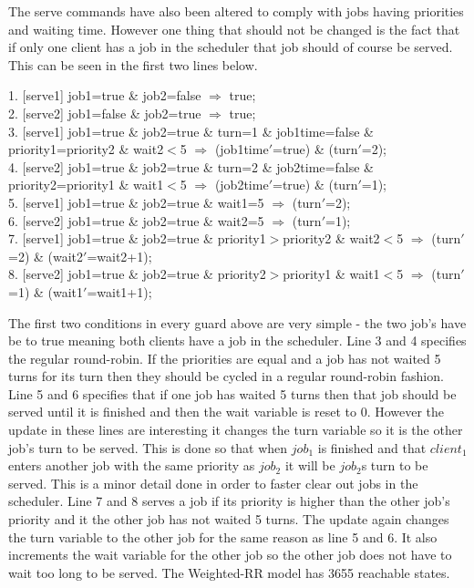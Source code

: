 \documentclass[12pt]{report}
\begin{document}
The serve commands have also been altered to comply with jobs having priorities and waiting time. However one thing that should not be changed is the fact that if only one client has a job in the scheduler that job should of course be served. This can be seen in the first two lines below.
\begin{center}
1. {[serve1]} job1=true \& job2=false $\Rightarrow$ true;\\
2. {[serve2]} job1=false \& job2=true $\Rightarrow$ true;\\
3. {[serve1]} job1=true \& job2=true \& turn=1 \& job1time=false \& priority1=priority2 \& wait2$<$5 $\Rightarrow$ (job1time$'$=true) \& (turn$'$=2);\\
4. {[serve2]} job1=true \& job2=true \& turn=2 \& job2time=false \& priority2=priority1 \& wait1$<$5 $\Rightarrow$ (job2time$'$=true) \& (turn$'$=1);\\
5. {[serve1]} job1=true \& job2=true \& wait1=5 $\Rightarrow$ (turn$'$=2);\\
6. {[serve2]} job1=true \& job2=true \& wait2=5 $\Rightarrow$ (turn$'$=1);\\
7. {[serve1]} job1=true \& job2=true \& priority1$>$priority2 \& wait2$<$5 $\Rightarrow$ (turn$'$=2) \& (wait2$'$=wait2+1);\\
8. {[serve2]} job1=true \& job2=true \& priority2$>$priority1 \& wait1$<$5 $\Rightarrow$ (turn$'$=1) \& (wait1$'$=wait1+1);
\end{center}
The first two conditions in every guard above are very simple - the two job's have be to true meaning both clients have a job in the scheduler. Line 3 and 4 specifies the regular round-robin. If the priorities are equal and a job has not waited 5 turns for its turn then they should be cycled in a regular round-robin fashion. Line 5 and 6 specifies that if one job has waited 5 turns then that job should be served until it is finished and then the wait variable is reset to 0. However the update in these lines are interesting it changes the turn variable so it is the other job's turn to be served. This is done so that when $job_1$ is finished and that $client_1$ enters another job with the same priority as $job_2$ it will be $job_2$s turn to be served. This is a minor detail done in order to faster clear out jobs in the scheduler. Line 7 and 8 serves a job if its priority is higher than the other job's priority and it the other job has not waited 5 turns. The update again changes the turn variable to the other job for the same reason as line 5 and 6. It also increments the wait variable for the other job so the other job does not have to wait too long to be served. The Weighted-RR model has 3655 reachable states.\\
\end{document}
